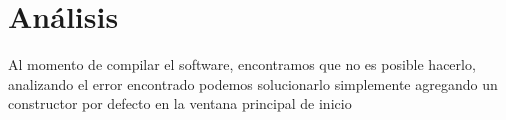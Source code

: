 \section{Análisis}
Al momento de compilar el software, encontramos que no es posible hacerlo, analizando el error encontrado podemos solucionarlo simplemente agregando un constructor por defecto en la ventana principal de inicio